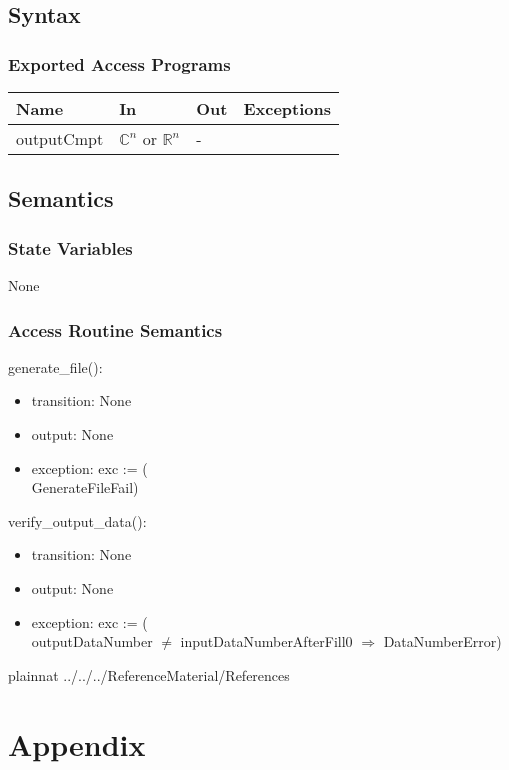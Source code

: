 \documentclass[12pt, titlepage]{article}
\begin{document}
\subsection{Syntax}

\subsubsection{Exported Access Programs}

\begin{center}
\begin{tabular}{p{2cm} p{4cm} p{4cm} p{2cm}}
\hline
\textbf{Name} & \textbf{In} & \textbf{Out} & \textbf{Exceptions} \\
\hline
outputCmpt & $\mathbb{C}^ n$ or $\mathbb{R}^ n$& - & \\

\hline
\end{tabular}
\end{center}

\subsection{Semantics}

\subsubsection{State Variables}
None

\subsubsection{Access Routine Semantics}

generate\_file():

\begin{itemize}
\item transition: None
\item output:  None
\item exception: exc := (\\
GenerateFileFail)
\end{itemize}
verify\_output\_data():
\begin{itemize}
\item transition: None
\item output:  None
\item exception: exc := (\\
outputDataNumber $\neq$ inputDataNumberAfterFill0 $\Rightarrow$ DataNumberError)
\end{itemize}


\newpage

 {plainnat}
 {../../../ReferenceMaterial/References}

\newpage

\section{Appendix} \label{Appendix}

\end{document}
